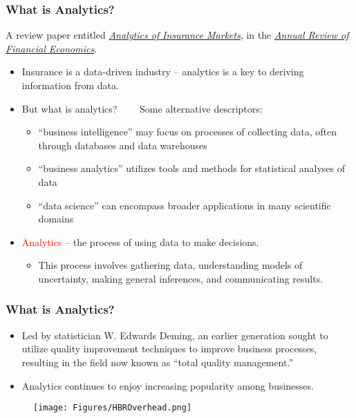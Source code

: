 \documentclass[serif,10pt]{beamer}
\begin{document}
\begin{frame}
\frametitle{What is Analytics?}

A review paper entitled \href{http://www.annualreviews.org/doi/abs/10.1146/annurev-financial-111914-041815}{\textit{Analytics of Insurance Markets}}, in the \href{http://www.annualreviews.org/journal/financial}{\textit{Annual Review of Financial Economics}}.

 \begin{itemize}
 \item Insurance is a data-driven industry -- analytics is a key to deriving information from data.
  \item But what is analytics? \pause \ \ \ \ Some alternative descriptors:
   \begin{itemize}
 \item ``business intelligence'' may focus on processes of collecting data, often through databases and data warehouses
 \item ``business analytics'' utilizes tools and methods for statistical analyses of data
  \item ``data science'' can encompass broader applications in many scientific domains
  \end{itemize}
  \pause
  \item \textcolor{red}{Analytics} -- the process of using data to make decisions.
     \begin{itemize}
  \item This process involves gathering data, understanding models of uncertainty, making general inferences, and communicating results.
    \end{itemize}
\end{itemize}\end{frame}



\begin{frame}
\frametitle{What is Analytics?}
 \begin{itemize}
  \item Led by statistician W. Edwards Deming, an earlier generation sought to utilize quality improvement techniques to improve business processes, resulting in the field now known as ``total quality management.'' \pause
  \item Analytics continues to enjoy increasing popularity among businesses.
\end{itemize}
\begin{figure}[htp]
\begin{center}
\texttt{[image: Figures/HBROverhead.png]}
  \end{center}
\end{figure}
\end{frame}
\end{document}
